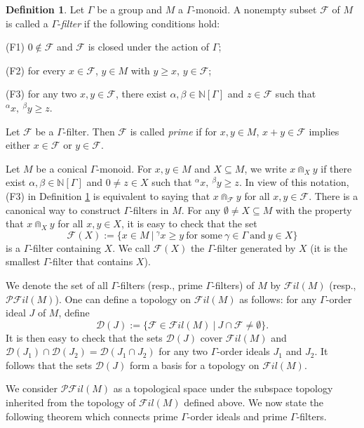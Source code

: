 \documentclass[a4paper,reqno,12pt]{amsart}
\numberwithin{equation}{section}
\theoremstyle{definition}
\newtheorem{dfn}[thm]{Definition}
\theoremstyle{remark}
\begin{document}
\begin{dfn}\label{def Gamma filters and prime Gamma filters}
Let $\Gamma$ be a group and $M$ a $\Gamma$-monoid. A nonempty subset $\mathcal{F}$ of $M$ is called a $\Gamma$-\emph{filter} if the following conditions hold:

(F1) $0\notin \mathcal{F}$ and $\mathcal F$ is closed under the action of $\Gamma$;

(F2) for every $x\in \mathcal{F}$, $y\in M$ with $y\ge x$, $y\in \mathcal{F}$; 

(F3) for any two $x,y\in \mathcal{F}$, there exist $\alpha,\beta\in \mathbb{N}[\Gamma]$ and $z\in \mathcal{F}$ such that $^\alpha x,~^\beta y\ge z$. 

Let $\mathcal{F}$ be a $\Gamma$-filter. Then $\mathcal{F}$ is called \emph{prime} if for $x,y\in M$, $x+y\in \mathcal{F}$ implies either $x\in \mathcal{F}$ or $y\in \mathcal{F}$. 
\end{dfn}

Let $M$ be a conical $\Gamma$-monoid. For $x,y\in M$ and $X\subseteq M$, we write $x \Cap_X y$ if there exist $\alpha,\beta\in \mathbb{N}[\Gamma]$ and $0\neq z\in X$ such that $^\alpha x,~^\beta y\ge z$. In view of this notation, (F3) in Definition \ref{def Gamma filters and prime Gamma filters} is equivalent to saying that $x\Cap_\mathcal{F} y$ for all $x,y\in \mathcal{F}$. There is a canonical way to construct $\Gamma$-filters in $M$. For any $\emptyset\neq X\subseteq M$ with the property that $x\Cap_X y$ for all $x,y\in X$, it is easy to check that the set \[\mathcal{F}(X):=\{x\in M~|~^\gamma x\ge y~\text{for some}~\gamma\in \Gamma~\text{and}~y\in X\}\] is a $\Gamma$-filter containing $X$. We call $\mathcal{F}(X)$ the $\Gamma$-filter generated by $X$ (it is the smallest $\Gamma$-filter that contains $X$).

We denote the set of all $\Gamma$-filters (resp., prime $\Gamma$-filters) of $M$ by $\mathscr{F}il(M)$ (resp., $\mathscr{P}\mathscr{F}il(M)$). One can define a topology on $\mathscr{F}il(M)$ as follows: for any $\Gamma$-order ideal $J$ of $M$, define \[\mathscr{D}(J):=\{\mathcal{F}\in \mathscr{F}il(M)~|~J\cap \mathcal{F}\neq \emptyset\}.\] It is then easy to check that the sets $\mathscr{D}(J)$ cover $\mathscr{F}il(M)$ and $\mathscr{D}(J_1)\cap \mathscr{D}(J_2)=\mathscr{D}(J_1\cap J_2)$ for any two $\Gamma$-order ideals $J_1$ and $J_2$. It follows that the sets $\mathscr{D}(J)$ form a basis for a topology on $\mathscr{F}il(M)$.

We consider $\mathscr{P}\mathscr{F}il(M)$ as a topological space under the subspace topology inherited from the topology of $\mathscr{F}il(M)$ defined above. We now state the following theorem which connects prime $\Gamma$-order ideals and prime $\Gamma$-filters.
\end{document}
